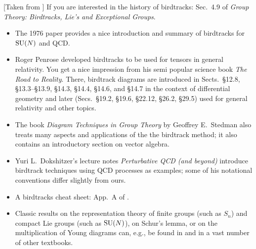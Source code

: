[Taken from ]
If you are interested in the history of birdtracks:
Sec.~4.9 of {\em Group Theory: Birdtracks, Lie's and Exceptional Groups}.

\vspace{1ex}

\begin{itemize}
\item The 1976 paper provides a
  nice introduction and summary of birdtracks for $\textrm{SU}(N)$ and QCD.
\item Roger Penrose developed birdtracks to be used for tensors in
  general relativity. You get a nice impression from his semi
  popular science book {\it The Road to Reality}. There,
  birdtrack diagrams are introduced in Sects.~\S12.8, \S13.3--\S13.9,
  \S14.3, \S14.4, \S14.6, and \S14.7 in the context of differential
  geometry and later (Secs.~\S19.2, \S19.6, \S22.12, \S26.2, \S29.5)
  used for general relativity and other topics.
\item The book {\it Diagram Techniques in Group Theory} by Geoffrey
  E.\ Stedman also treats many aspects and applications
  of the the birdtrack method; it also contains an introductory
  section on vector algebra.
\item Yuri L.\ Dokshitzer's lecture notes {\it Perturbative QCD (and
    beyond)} introduce birdtrack techniques using
  QCD processes as examples; some of his notational conventions differ
  slightly from ours.
\item A birdtracks cheat sheet: App.~A of .
\end{itemize}

\begin{itemize}
\item Classic results on the representation theory of finite groups (such as
$S_n$) and compact Lie groups (such as $\textrm{SU}(N)$), on Schur's lemma, or
on the multiplication of Young diagrams can, e.g., be found in
  and in a vast number of other textbooks.
\end{itemize}

\vspace{1ex}

